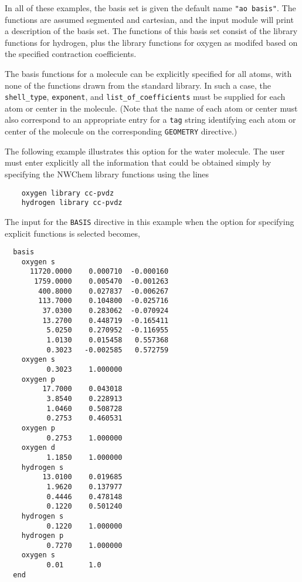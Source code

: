 In all of these examples, the basis set is given the default name
\verb+"ao basis"+.  The functions are assumed segmented and cartesian,
and the input module will print a description of the basis set.  The functions
of this basis set consist of the library functions for hydrogen, plus
the library functions for oxygen as modifed based on the specified contraction
coefficients.

The basis functions for a molecule can be explicitly specified for all
atoms, with none of the functions drawn from the standard library.  In such
a case, the \verb+shell_type+, \verb+exponent+, and \verb+list_of_coefficients+
must be supplied for each atom or center in the molecule.  (Note that 
the name of
each atom or center must also correspond to an appropriate entry for 
a \verb+tag+ string
identifying each atom or center of the molecule on the corresponding
\verb+GEOMETRY+ directive.)


The following example illustrates this option for the water molecule.  The
user must enter explicitly all the information that could be obtained
simply by specifying the NWChem library functions using the lines
 
\begin{verbatim}
    oxygen library cc-pvdz
    hydrogen library cc-pvdz
\end{verbatim}

The input for the \verb+BASIS+ directive in this example when the option
for specifying explicit functions is selected becomes,

\begin{verbatim}
  basis
    oxygen s
      11720.0000    0.000710  -0.000160
       1759.0000    0.005470  -0.001263
        400.8000    0.027837  -0.006267
        113.7000    0.104800  -0.025716
         37.0300    0.283062  -0.070924
         13.2700    0.448719  -0.165411
          5.0250    0.270952  -0.116955
          1.0130    0.015458   0.557368
          0.3023   -0.002585   0.572759
    oxygen s                
          0.3023    1.000000
    oxygen p                
         17.7000    0.043018
          3.8540    0.228913
          1.0460    0.508728
          0.2753    0.460531
    oxygen p                
          0.2753    1.000000
    oxygen d
          1.1850    1.000000
    hydrogen s
         13.0100    0.019685
          1.9620    0.137977
          0.4446    0.478148
          0.1220    0.501240
    hydrogen s  
          0.1220    1.000000
    hydrogen p  
          0.7270    1.000000
    oxygen s
          0.01      1.0
  end
\end{verbatim}

